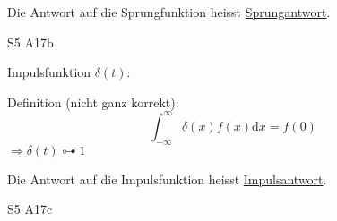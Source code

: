 Die Antwort auf die Sprungfunktion heisst \underline{Sprungantwort}.

 S5 A17b

Impulsfunktion $\delta(t)$:
\begin{center}
\end{center}
Definition (nicht ganz korrekt):
\begin{equation*}
    \int _{-\infty}^{\infty} \delta(x)f(x) \text{d}x = f(0)
\end{equation*}
$\Rightarrow \delta(t) \multimapdotbothA 1$ 

Die Antwort auf die Impulsfunktion heisst \underline{Impulsantwort}.

 S5 A17c
